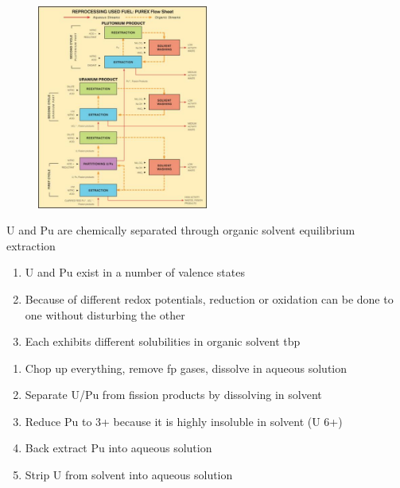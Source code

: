 \documentclass[aspectratio=1610,pdftex,dvipsnames,compress,xcolor={dvipsnames}]{beamer}
\newcommand{\acs}{\acrshort} %
\begin{document}
\begin{frame}{}
    \begin{figure}
        \centering
        \includegraphics[width=0.50\textwidth]{purex.jpg}
    \end{figure}
\end{frame}


\begin{frame}{U and Pu are chemically separated through organic solvent equilibrium extraction}
    \begin{enumerate}[topsep=0pt,itemsep=11pt,leftmargin=*,label=(\arabic*)]
        \item[]U and Pu exist in a number of valence states
        \item[]Because of different redox potentials, reduction or oxidation can be done to one without disturbing the other
        \item[]Each exhibits different solubilities in organic solvent \acs{tbp}
    \end{enumerate}

    \vspace{0.25in}
    
    \begin{enumerate}[topsep=0pt,itemsep=7pt,leftmargin=*,label=(\arabic*)]
        \item Chop up everything, remove \acs{fp} gases, dissolve in aqueous solution
        \item Separate U/Pu from fission products by dissolving in solvent
        \item Reduce Pu to 3+ because it is highly insoluble in solvent (U 6+)
        \item Back extract Pu into aqueous solution  
        \item Strip U from solvent into aqueous solution
    \end{enumerate}
\end{frame}
\end{document}

